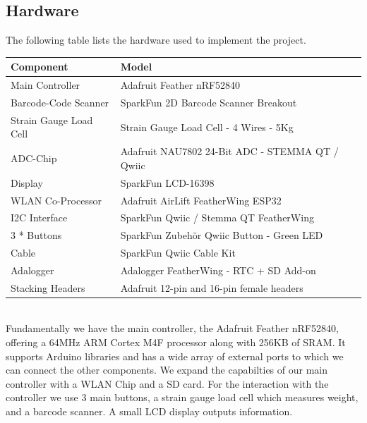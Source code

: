 \documentclass{article}
\begin{document}
\subsection{Hardware}
The following table lists the hardware used to implement the project.
\\[10pt]
\begin{tabular}{l l}
	\hline
	Component              & Model\\
	\hline
	Main Controller        & Adafruit Feather nRF52840\\
	Barcode-Code Scanner   & SparkFun 2D Barcode Scanner Breakout\\
	Strain Gauge Load Cell & Strain Gauge Load Cell - 4 Wires - 5Kg\\
	ADC-Chip               & Adafruit NAU7802 24-Bit ADC - STEMMA QT / Qwiic\\
	Display                & SparkFun LCD-16398\\
	WLAN Co-Processor      & Adafruit AirLift FeatherWing ESP32\\
	I2C Interface          & SparkFun Qwiic / Stemma QT FeatherWing\\
	3 * Buttons            & SparkFun Zubehör Qwiic Button - Green LED\\
	Cable                  & SparkFun Qwiic Cable Kit\\
	Adalogger              & Adalogger FeatherWing - RTC + SD Add-on\\
	Stacking Headers       & Adafruit 12-pin and 16-pin female headers\\
	\hline
\end{tabular} \\[10pt]
Fundamentally we have the main controller, the Adafruit Feather nRF52840, offering a 64MHz ARM Cortex M4F processor along with 256KB of SRAM.
It supports Arduino libraries and has a wide array of external ports to which we can connect the other components.
We expand the capabilties of our main controller with a WLAN Chip and a SD card.
For the interaction with the controller we use 3 main buttons, a strain gauge load cell which measures weight, and a barcode scanner.
A small LCD display outputs information. 
\end{document}
